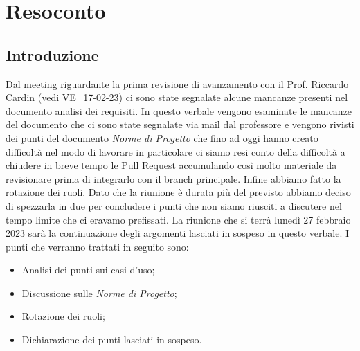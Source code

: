 \section{Resoconto}
\subsection{Introduzione}

Dal meeting riguardante la prima revisione di avanzamento con il Prof. Riccardo Cardin (vedi VE\_17-02-23) ci sono state segnalate 
alcune mancanze presenti nel documento analisi dei requisiti.
In questo verbale vengono esaminate le mancanze del documento che ci sono state segnalate via mail dal professore e vengono rivisti dei punti del documento \textit{Norme di Progetto}
che fino ad oggi hanno creato difficoltà nel modo di lavorare in particolare ci siamo resi conto della difficoltà a chiudere in breve tempo le Pull Request
accumulando così molto materiale da revisionare prima di integrarlo con il branch principale.
Infine abbiamo fatto la rotazione dei ruoli.
 Dato che la riunione è durata più del previsto abbiamo deciso di spezzarla in due per concludere i punti che non siamo riusciti a discutere nel tempo limite che ci eravamo prefissati.
La riunione che si terrà lunedì 27 febbraio 2023 sarà la continuazione degli argomenti lasciati in sospeso in questo verbale.
I punti che verranno trattati in seguito sono:
\begin{itemize}
    \item Analisi dei punti sui casi d'uso;
    \item Discussione sulle \textit{Norme di Progetto};
    \item Rotazione dei ruoli;
    \item Dichiarazione dei punti lasciati in sospeso.
\end{itemize}

